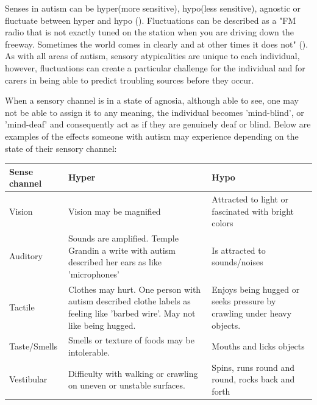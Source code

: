 \documentclass[11pt]{report}
\begin{document}
Senses in autism can be hyper(more sensitive), hypo(less sensitive), agnostic or fluctuate between hyper and hypo (\cite{bayes}). Fluctuations can be described as a "FM radio that is not exactly tuned on the station when you are driving down the freeway. Sometimes the world comes in clearly and at other times it does not" (\cite{olgab}). As with all areas of autism, sensory atypicalities are unique to each individual, however, fluctuations can create a particular challenge for the individual and for carers in being able to predict troubling sources before they occur. 

When a sensory channel is in a state of agnosia, although able to see, one may not be able to assign it to any meaning, the individual becomes 'mind-blind', or 'mind-deaf' and consequently act as if they are genuinely deaf or blind. Below are examples of the effects someone with autism may experience depending on the state of their sensory channel:

\begin{table}[H]
    \begin{tabular}{| l | p{5cm} | p{5cm} |}
    \hline
    Sense channel & Hyper                                                                                                                      & Hypo                                                                   \\
    \hline
    \hline
    Vision        & Vision may be magnified                                                                                                    & Attracted to light or fascinated with bright colors                    \\
    \hline
    Auditory      & Sounds are amplified. Temple Grandin a write with autism described her ears as like 'microphones'                          & Is attracted to sounds/noises                                          \\
    \hline
    Tactile       & Clothes may hurt. One person with autism described clothe labels as feeling like 'barbed wire'. May not like being hugged. & Enjoys being hugged or seeks pressure by crawling under heavy objects. \\
    \hline
    Taste/Smells & Smells or texture of foods may be intolerable. & Mouths and licks objects \\
    \hline
    Vestibular & Difficulty with walking or crawling on uneven or unstable surfaces. & Spins, runs round and round, rocks back and forth \\
    \hline
    \end{tabular}
\end{table}
\end{document}
